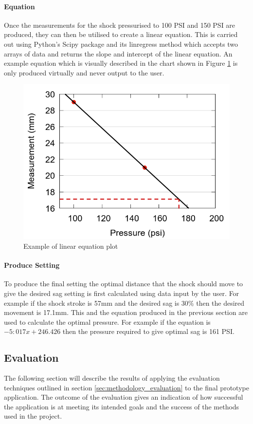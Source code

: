 		\paragraph{Equation}
			Once the measurements for the shock pressurised to 100 PSI and 150 PSI are produced, they can then be utilised to create a linear equation. This is carried out using Python’s Scipy package and its linregress method which accepts two arrays of data and returns the slope and intercept of the linear equation. An example equation which is visually described in the chart shown in Figure \ref{fig:equation_plot} is only produced virtually and never output to the user.
			\begin{figure}[h!]
				\centering
				\includegraphics[scale=0.4]{../images/results/scatter_dotted.png}
				\caption{Example of linear equation plot}
				\label{fig:equation_plot}
			\end{figure}
		\paragraph{Produce Setting}
			To produce the final setting the optimal distance that the shock should move to give the desired sag setting is first calculated using data input by the user. For example if the shock stroke is 57mm and the desired sag is 30\% then the desired movement is 17.1mm. This and the equation produced in the previous section are used to calculate the optimal pressure. For example if the equation is $-5:017x+246.426$ then the pressure required to give optimal sag is 161 PSI.
\clearpage
	\subsection{Evaluation}\label{sec:evaluation}
		The following section will describe the results of applying the evaluation techniques outlined in section \ref{sec:methodology_evaluation} to the final prototype application. The outcome of the evaluation gives an indication of how successful the application is at meeting its intended goals and the success of the methods used in the project.
